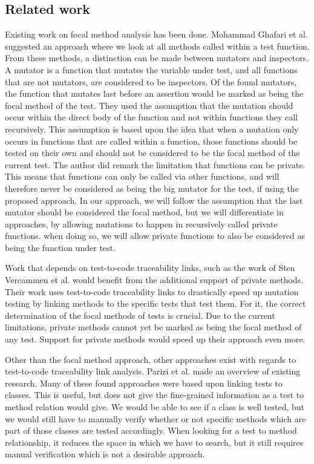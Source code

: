 \documentclass[11pt]{article}
\begin{document}
\begin{multicols}{2}
\section{Related work}
Existing work on focal method analysis has been done. Mohammad Ghafari et al.\cite{ghafari2015automatically} suggested an approach where we look at all methods called within a test function. From these methods, a distinction can be made between mutators and inspectors. A mutator is a function that mutates the variable under test, and all functions that are not mutators, are considered to be inspectors. Of the found mutators, the function that mutates last before an assertion would be marked as being the focal method of the test. They used the assumption that the mutation should occur within the direct body of the function and not within functions they call recursively. This assumption is based upon the idea that when a mutation only occurs in functions that are called within a function, those functions should be tested on their own and should not be considered to be the focal method of the current test. The author did remark the limitation that functions can be private. This means that functions can only be called via other functions, and will therefore never be considered as being the big mutator for the test, if using the proposed approach. In our approach, we will follow the assumption that the last mutator should be considered the focal method, but we will differentiate in approaches, by allowing mutations to happen in recursively called private functions. when doing so, we will allow private functions to also be considered as being the function under test.

Work that depends on test-to-code traceability links, such as the work of Sten Vercammen et al. \cite{10.1145/3278186.3278190} would beneﬁt from the additional support of private methods. Their work uses test-to-code traceability links to drastically speed up mutation testing by linking methods to the specific tests that test them. For it, the correct determination of the focal methods of tests is crucial. Due to the current limitations, private methods cannot yet be marked as being the focal method of any test. Support for private methods would speed up their approach even more.
 
Other than the focal method approach, other approaches exist with regards to test-to-code traceability link analysis. Parizi et al. \cite{6862933} made an overview of existing research. Many of these found approaches \cite{10.1007/978-3-030-24305-0_40, 8823709, 6080780, 8452876, qusef2014recovering, van2009establishing} were based upon linking tests to classes. This is useful, but does not give the fine-grained information as a test to method relation would give. We would be able to see if a class is well tested, but we would still have to manually verify whether or not specific methods which are part of those classes are tested accordingly. When looking for a test to method relationship, it reduces the space in which we have to search, but it still requires manual verification which is not a desirable approach.


\end{multicols}
\end{document}
